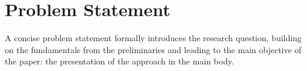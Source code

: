 
\chapter{Problem Statement}
\label{ch:problemstatement}

A concise problem statement formally introduces the research question, building on the fundamentals from the preliminaries and leading to the main objective of the paper: the presentation of the approach in the main body.




